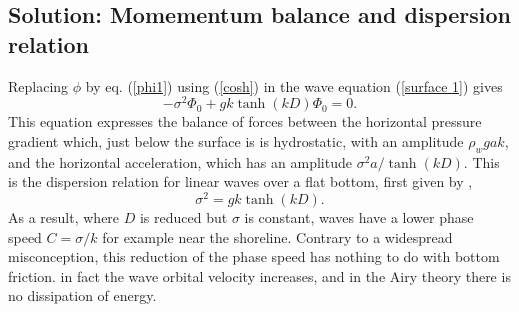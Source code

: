 

\subsection{Solution: Momementum balance and dispersion relation}
Replacing $\phi$ by eq. (\ref{phi1}) using (\ref{cosh}) in the wave equation (\ref{surface 1}) gives  
\begin{equation}
    - \sigma^2 \Phi_0 +gk\tanh\left(kD\right)\Phi_0=0.
     \label{onde 1}
\end{equation}
This equation expresses the balance of forces between the horizontal pressure gradient which, just below the surface is 
is hydrostatic, with an amplitude  $\rho_w g a k$, and the horizontal acceleration, which has an amplitude  $\sigma^2 a / \tanh(kD)$. 
This is the dispersion relation for linear waves over a flat bottom, first given by \cite{Laplace1776}, 
\begin{equation}
    \sigma^2=g k \tanh\left(kD\right).
     \label{dispersion}
\end{equation}
As a result, where $D$ is reduced but $\sigma$ is constant, waves have a lower phase speed $C=\sigma/k$  for example near the shoreline. 
Contrary to a widespread misconception, this reduction of the phase speed has nothing to do with bottom friction.
in fact the wave orbital velocity increases, and in the Airy theory there is no dissipation of energy.




